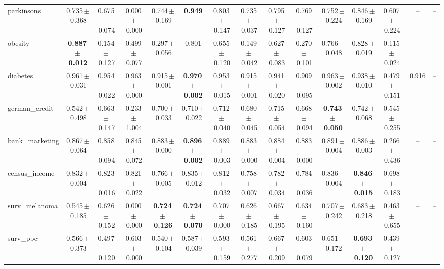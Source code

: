 \documentclass[8pt]{extarticle}
\begin{document}
\begin{longtable}{l*{14}{c}}
parkinsons & 0.735\,$\pm$\,0.368 & 0.675\,$\pm$\,0.074 & 0.000\,$\pm$\,0.000 & 0.744\,$\pm$\,0.169 & \textbf{0.949} & 0.803\,$\pm$\,0.147 & 0.735\,$\pm$\,0.037 & 0.795\,$\pm$\,0.127 & 0.769\,$\pm$\,0.127 & 0.752\,$\pm$\,0.224 & 0.846\,$\pm$\,0.169 & 0.607\,$\pm$\,0.224 & -- & -- \\
obesity & \textbf{0.887\,$\pm$\,0.012} & 0.154\,$\pm$\,0.127 & 0.499\,$\pm$\,0.077 & 0.297\,$\pm$\,0.056 & 0.801 & 0.655\,$\pm$\,0.120 & 0.149\,$\pm$\,0.042 & 0.627\,$\pm$\,0.083 & 0.270\,$\pm$\,0.101 & 0.766\,$\pm$\,0.048 & 0.828\,$\pm$\,0.019 & 0.115\,$\pm$\,0.024 & -- & -- \\
diabetes & 0.961\,$\pm$\,0.031 & 0.954\,$\pm$\,0.022 & 0.963\,$\pm$\,0.000 & 0.915\,$\pm$\,0.001 & \textbf{0.970\,$\pm$\,0.002} & 0.953\,$\pm$\,0.015 & 0.915\,$\pm$\,0.001 & 0.941\,$\pm$\,0.020 & 0.909\,$\pm$\,0.095 & 0.963\,$\pm$\,0.002 & 0.938\,$\pm$\,0.010 & 0.479\,$\pm$\,0.151 & 0.916 & -- \\
german\_credit & 0.542\,$\pm$\,0.498 & 0.663\,$\pm$\,0.147 & 0.233\,$\pm$\,1.004 & 0.700\,$\pm$\,0.033 & 0.710\,$\pm$\,0.022 & 0.712\,$\pm$\,0.040 & 0.680\,$\pm$\,0.045 & 0.715\,$\pm$\,0.054 & 0.668\,$\pm$\,0.094 & \textbf{0.743\,$\pm$\,0.050} & 0.742\,$\pm$\,0.068 & 0.545\,$\pm$\,0.255 & -- & -- \\
bank\_marketing & 0.867\,$\pm$\,0.064 & 0.858\,$\pm$\,0.094 & 0.845\,$\pm$\,0.072 & 0.883\,$\pm$\,0.000 & \textbf{0.896\,$\pm$\,0.002} & 0.889\,$\pm$\,0.003 & 0.883\,$\pm$\,0.000 & 0.884\,$\pm$\,0.004 & 0.883\,$\pm$\,0.000 & 0.891\,$\pm$\,0.004 & 0.886\,$\pm$\,0.003 & 0.266\,$\pm$\,0.436 & -- & -- \\
census\_income & 0.832\,$\pm$\,0.004 & 0.823\,$\pm$\,0.016 & 0.821\,$\pm$\,0.022 & 0.766\,$\pm$\,0.005 & 0.835\,$\pm$\,0.012 & 0.812\,$\pm$\,0.032 & 0.758\,$\pm$\,0.007 & 0.782\,$\pm$\,0.034 & 0.784\,$\pm$\,0.036 & 0.836\,$\pm$\,0.004 & \textbf{0.846\,$\pm$\,0.015} & 0.698\,$\pm$\,0.183 & -- & -- \\
surv\_melanoma & 0.545\,$\pm$\,0.185 & 0.626\,$\pm$\,0.152 & 0.000\,$\pm$\,0.000 & \textbf{0.724\,$\pm$\,0.126} & \textbf{0.724\,$\pm$\,0.070} & 0.707\,$\pm$\,0.000 & 0.626\,$\pm$\,0.185 & 0.667\,$\pm$\,0.195 & 0.634\,$\pm$\,0.160 & 0.707\,$\pm$\,0.242 & 0.683\,$\pm$\,0.218 & 0.463\,$\pm$\,0.655 & -- & -- \\
surv\_pbc & 0.566\,$\pm$\,0.373 & 0.497\,$\pm$\,0.120 & 0.603\,$\pm$\,0.000 & 0.540\,$\pm$\,0.104 & 0.587\,$\pm$\,0.039 & 0.593\,$\pm$\,0.159 & 0.561\,$\pm$\,0.277 & 0.667\,$\pm$\,0.209 & 0.603\,$\pm$\,0.079 & 0.651\,$\pm$\,0.172 & \textbf{0.693\,$\pm$\,0.120} & 0.439\,$\pm$\,0.127 & -- & -- \\

\end{longtable}
\end{document}
